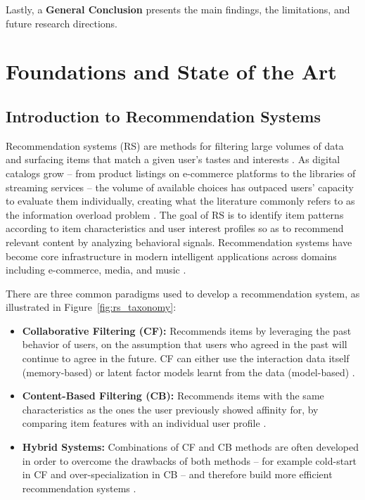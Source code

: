 \documentclass[12pt,a4paper]{report}
\begin{document}
Lastly, a \textbf{General Conclusion} presents the main findings, the
limitations, and future research directions.


\chapter{Foundations and State of the Art}

\section{Introduction to Recommendation Systems}

\justifying
Recommendation systems (RS) are methods for filtering large volumes of data
and surfacing items that match a given user's tastes and interests
\citep{castells2023primer}. As digital catalogs grow -- from product
listings on e-commerce platforms to the libraries of streaming services --
the volume of available choices has outpaced users' capacity to evaluate
them individually, creating what the literature commonly refers to as the
information overload problem \citep{raza2024comprehensive}. The goal of RS
is to identify item patterns according to item characteristics and user
interest profiles so as to recommend relevant content by analyzing
behavioral signals. Recommendation systems have become core infrastructure
in modern intelligent applications across domains including e-commerce,
media, and music \citep{raza2024comprehensive}.

There are three common paradigms used to develop a recommendation system, as
illustrated in Figure~\ref{fig:rs_taxonomy}:

\begin{itemize}
    \item \textbf{Collaborative Filtering (CF):} Recommends items by
    leveraging the past behavior of users, on the assumption that users who
    agreed in the past will continue to agree in the future. CF can either
    use the interaction data itself (memory-based) or latent factor models
    learnt from the data (model-based) \citep{castells2023primer}.

    \item \textbf{Content-Based Filtering (CB):} Recommends items with the
    same characteristics as the ones the user previously showed affinity for,
    by comparing item features with an individual user profile
    \citep{raza2024comprehensive}.

    \item \textbf{Hybrid Systems:} Combinations of CF and CB methods are often
    developed in order to overcome the drawbacks of both methods -- for
    example cold-start in CF and over-specialization in CB -- and therefore
    build more efficient recommendation systems \citep{raza2024comprehensive}.
\end{itemize}
\end{document}
